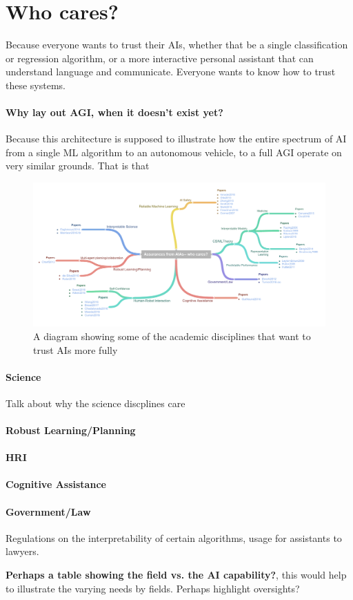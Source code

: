 \section{Who cares?}
    Because everyone wants to trust their AIs, whether that be a single classification or regression algorithm, or a more interactive personal assistant that can understand language and communicate. Everyone wants to know how to trust these systems.  

    \paragraph{Why lay out AGI, when it doesn't exist yet?} Because this architecture is supposed to illustrate how the entire spectrum of AI from a single ML algorithm to an autonomous vehicle, to a full AGI operate on very similar grounds. That is that 

	\begin{figure}
        \includegraphics[width=8in]{Figures/WhoCares.pdf}%
    	\caption{A diagram showing some of the academic disciplines that want to trust AIs more fully}
        \label{fig:WhoCares}
    \end{figure}

    \paragraph{Science} Talk about why the science discplines care
    \paragraph{Robust Learning/Planning}
    \paragraph{HRI}
    \paragraph{Cognitive Assistance} 
    \paragraph{Government/Law} Regulations on the interpretability of certain algorithms, usage for assistants to lawyers.

    \textbf{Perhaps a table showing the field vs. the AI capability?}, this would help to illustrate the varying needs by fields. Perhaps highlight oversights?

